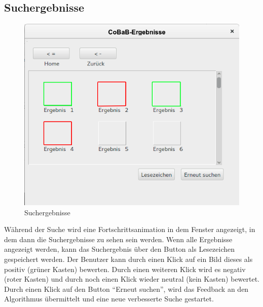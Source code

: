 \subsection{Suchergebnisse}
\begin{figure}[H]
\includegraphics[width=1\linewidth]{img/Suchergebnisse2}
\caption{Suchergebnisse}
\label{fig:suchergebnisse}
\end{figure}
Während der Suche wird eine Fortschrittsanimation in dem Fenster angezeigt, in dem dann die Suchergebnisse zu sehen sein werden. Wenn alle Ergebnisse angezeigt werden, kann das Suchergebnis über den Button als \gls{Lesezeichen} gespeichert werden.\newline 
Der Benutzer kann durch einen Klick auf ein Bild dieses als positiv (grüner Kasten) bewerten. Durch einen weiteren Klick wird es negativ (roter Kasten) und durch noch einen Klick wieder neutral (kein Kasten) bewertet. Durch einen Klick auf den Button \enquote{Erneut suchen}, wird das \gls{Feedback} an den Algorithmus übermittelt und eine neue verbesserte Suche gestartet.
\pagebreak
